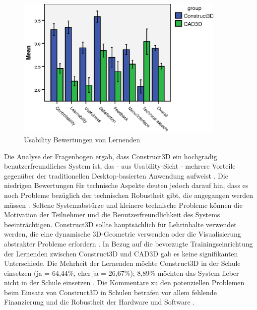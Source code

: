 \documentclass[deutsch]{llncs}
\begin{document}
\begin{figure}[t]
	\centering
	\includegraphics[width=0.9\textwidth]{figures/stat1}
	\caption{Usability Bewertungen von Lernenden}
	\label{fig:stat1}
\end{figure}
Die Analyse der Fragenbogen ergab, dass Construct3D ein hochgradig benutzerfreundliches System ist, das - aus Usability-Sicht - mehrere Vorteile gegenüber der traditionellen Desktop-basierten Anwendung aufweist \cite{Kaufmann_summaryof}. Die niedrigen Bewertungen für technische Aspekte deuten jedoch darauf hin, dass es noch Probleme bezüglich der technischen Robustheit gibt, die angegangen werden müssen \cite{Kaufmann_summaryof}. Seltene Systemabstürze und kleinere technische Probleme können die Motivation der Teilnehmer und die Benutzerfreundlichkeit des Systems beeinträchtigen. Construct3D sollte hauptsächlich für Lehrinhalte verwendet werden, die eine dynamische 3D-Geometrie verwenden oder die Visualisierung abstrakter Probleme erfordern \cite{Kaufmann_summaryof}. In Bezug auf die bevorzugte Trainingseinrichtung der Lernenden zwischen Construct3D und CAD3D gab es keine signifikanten Unterschiede. Die Mehrheit der Lernenden möchte Construct3D in der Schule einsetzen (ja = 64,44\%, eher ja = 26,67\%); 8,89\% möchten das System lieber nicht in der Schule einsetzen \cite{Kaufmann_summaryof}.  Die Kommentare zu den potenziellen Problemen beim Einsatz von Construct3D in Schulen betrafen vor allem fehlende Finanzierung und die Robustheit der Hardware und Software \cite{Kaufmann_summaryof}.\\
\end{document}
